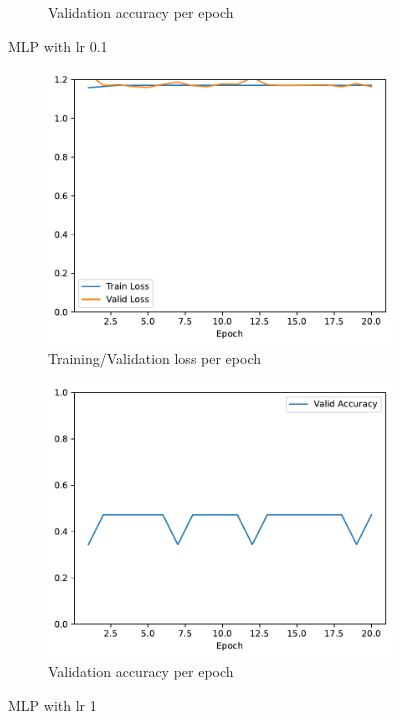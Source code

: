 \documentclass[11pt]{article}
\begin{document}
\begin{figure}[h!]
\begin{subfigure}{.5\textwidth}
  \caption{Validation accuracy per epoch}
\end{subfigure}
\caption{MLP with lr 0.1}
\label{fig:MLP_lr_0.1}
\end{figure}

\begin{figure}[h!]
\centering
\begin{subfigure}{.5\textwidth}
  \centering
  \includegraphics[width=.9\linewidth]{plots/mlp-training-loss-batch-16-lr-1.0-epochs-20-hidden-200-dropout-0.0-l2-0.0-layers-2-act-relu-opt-sgd}
  \caption{Training/Validation loss per epoch}
\end{subfigure}%
\begin{subfigure}{.5\textwidth}
  \centering
  \includegraphics[width=.9\linewidth]{plots/mlp-validation-accuracy-batch-16-lr-1.0-epochs-20-hidden-200-dropout-0.0-l2-0.0-layers-2-act-relu-opt-sgd}
  \caption{Validation accuracy per epoch}
\end{subfigure}
\caption{MLP with lr 1}
\label{fig:MLP_lr_1}
\end{figure}
\end{document}
